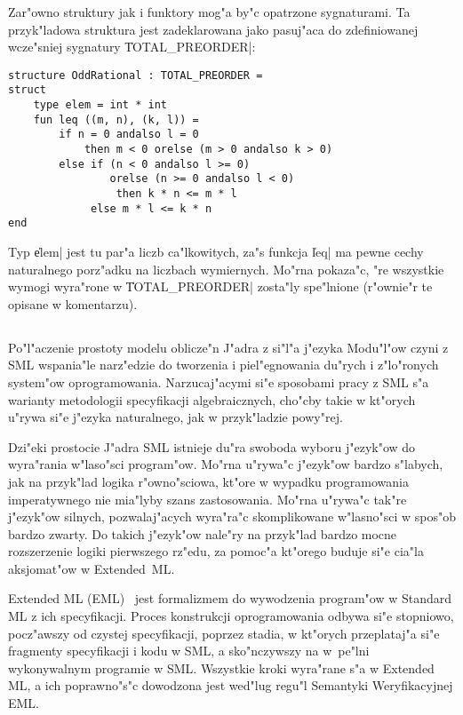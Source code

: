 Zar"owno struktury jak i funktory mog"a by"c opatrzone sygnaturami.
Ta przyk"ladowa struktura jest zadeklarowana jako pasuj"aca 
do zdefiniowanej wcze"sniej sygnatury \|TOTAL_PREORDER|:
\begin{verbatim}
structure OddRational : TOTAL_PREORDER =
struct
    type elem = int * int
    fun leq ((m, n), (k, l)) = 
        if n = 0 andalso l = 0 
            then m < 0 orelse (m > 0 andalso k > 0)
        else if (n < 0 andalso l >= 0) 
                orelse (n >= 0 andalso l < 0)
                 then k * n <= m * l
             else m * l <= k * n 
end
\end{verbatim}
Typ \|elem| jest tu par"a liczb ca"lkowitych,
za"s funkcja \|leq| ma pewne cechy naturalnego porz"adku na liczbach wymiernych.
Mo"rna pokaza"c, "re wszystkie wymogi wyra"rone w \|TOTAL_PREORDER| zosta"ly spe"lnione
(r"ownie"r te opisane w komentarzu).

\subsection{\seceml}
\label{sec:eml}

Po"l"aczenie prostoty modelu oblicze"n J"adra
z si"l"a j"ezyka Modu"l"ow czyni z SML wspania"le narz"edzie 
do tworzenia i piel"egnowania du"rych i z"lo"ronych system"ow oprogramowania.
Narzucaj"acymi si"e sposobami pracy z SML s"a warianty metodologii specyfikacji algebraicznych, 
cho"cby takie w kt"orych u"rywa si"e j"ezyka naturalnego, jak w przyk"ladzie powy"rej.

Dzi"eki prostocie J"adra SML istnieje du"ra swoboda wyboru 
j"ezyk"ow do wyra"rania w"laso"sci program"ow. 
Mo"rna u"rywa"c j"ezyk"ow bardzo s"labych, jak na przyk"lad logika r"owno"sciowa, 
kt"ore w wypadku programowania imperatywnego nie mia"lyby szans zastosowania.
Mo"rna u"rywa"c tak"re j"ezyk"ow silnych, 
pozwalaj"acych wyra"ra"c skomplikowane w"lasno"sci w spos"ob bardzo zwarty.
Do takich j"ezyk"ow nale"ry na przyk"lad bardzo mocne rozszerzenie logiki pierwszego rz"edu, 
za pomoc"a  kt"orego buduje si"e cia"la aksjomat"ow w Extended~ML.

Extended ML (EML)~\cite{bib:KST94} jest formalizmem do wywodzenia program"ow w Standard ML
z ich specyfikacji. Proces konstrukcji oprogramowania odbywa si"e stopniowo,
pocz"awszy od czystej specyfikacji, poprzez stadia, w kt"orych przeplataj"a
si"e fragmenty specyfikacji i kodu w SML, a sko"nczywszy na w~pe"lni wykonywalnym programie w SML.
Wszystkie kroki wyra"rane s"a w Extended ML, a ich poprawno"s"c dowodzona jest
wed"lug regu"l Semantyki Weryfikacyjnej EML.

